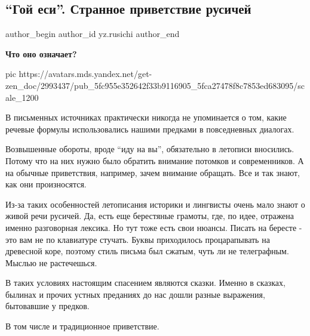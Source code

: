  
 
 
 
 
 
\subsection{\enquote{Гой еси}. Странное приветствие русичей}
\label{sec:08_12_2020.sites.ru.zen_yandex.yz.rusichi.1.goj_esi_privetstvije}
\ifcmt
	author_begin
   author_id yz.rusichi
	author_end
\fi

{\bfseries 
Что оно означает?
}

\ifcmt
  pic https://avatars.mds.yandex.net/get-zen_doc/2993437/pub_5fc955e352642f33b9116905_5fca27478f8c7853ed683095/scale_1200
\fi

В письменных источниках практически никогда не упоминается о том, какие речевые
формулы использовались нашими предками в повседневных диалогах.

Возвышенные обороты, вроде \enquote{иду на вы}, обязательно в летописи вносились.
Потому что на них нужно было обратить внимание потомков и современников. А на
обычные приветствия, например, зачем внимание обращать. Все и так знают, как
они произносятся.

Из-за таких особенностей летописания историки и лингвисты очень мало знают о
живой речи русичей. Да, есть еще берестяные грамоты, где, по идее, отражена
именно разговорная лексика. Но тут тоже есть свои нюансы. Писать на бересте -
это вам не по клавиатуре стучать. Буквы приходилось процарапывать на древесной
коре, поэтому стиль письма был сжатым, чуть ли не телеграфным. Мыслью не
растечешься.

В таких условиях настоящим спасением являются сказки. Именно в сказках, былинах
и прочих устных преданиях до нас дошли разные выражения, бытовавшие у предков.

В том числе и традиционное приветствие.


